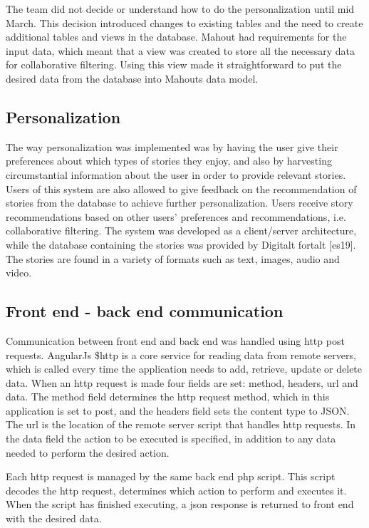 The team did not decide or understand how to do the personalization until mid March. This decision introduced changes to existing tables and the need to create additional tables and views in the database. Mahout had requirements for the input data, which meant that a view was created to store all the necessary data for collaborative filtering. Using this view made it straightforward to put the desired data from the database into Mahouts data model.

\subsection{Personalization}

The way personalization was implemented was by having the user give their preferences about which types of stories they enjoy, and also by harvesting circumstantial  information about the user in order to provide relevant stories. Users of this system are also allowed to give feedback on the recommendation of stories from the database to achieve further personalization.  Users receive story recommendations based on other users' preferences and recommendations, i.e. collaborative filtering. The system was developed as a client/server architecture, while the database containing the stories was provided by Digitalt fortalt [es19]. The stories are found in a variety of formats such as text, images, audio and video.

\subsection{Front end - back end communication}

Communication between front end and back end was handled using http post requests.
AngularJs \$http is a core service for reading data from remote servers, which is called every time the application needs to add, retrieve, update or delete data. When an http request is made four fields are set: method, headers, url and data. The method field determines the http request method, which in this application is set to post, and the headers field sets the content type to JSON. The url is the location of the remote server script that handles http requests. In the data field the action to be executed is specified, in addition to any data needed to perform the desired action.\newline

Each http request is managed by the same back end php script. This script decodes the http request, determines which action to perform and executes it. When the script has finished executing, a json response is returned to front end with the desired data.

\cleardoublepage